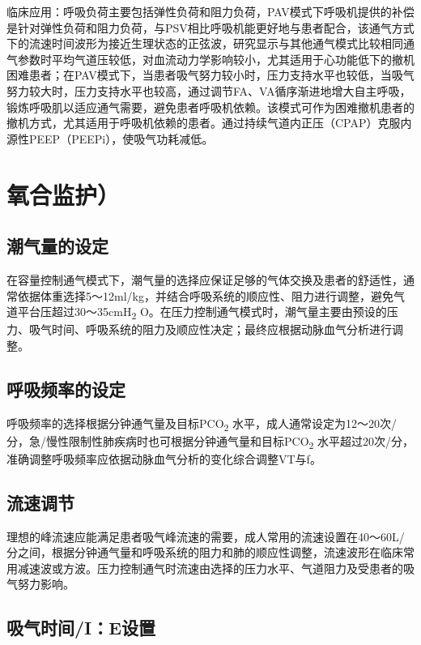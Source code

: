 临床应用：呼吸负荷主要包括弹性负荷和阻力负荷，PAV模式下呼吸机提供的补偿是针对弹性负荷和阻力负荷，与PSV相比呼吸机能更好地与患者配合，该通气方式下的流速时间波形为接近生理状态的正弦波，研究显示与其他通气模式比较相同通气参数时平均气道压较低，对血流动力学影响较小，尤其适用于心功能低下的撤机困难患者；在PAV模式下，当患者吸气努力较小时，压力支持水平也较低，当吸气努力较大时，压力支持水平也较高，通过调节FA、VA循序渐进地增大自主呼吸，锻炼呼吸肌以适应通气需要，避免患者呼吸机依赖。该模式可作为困难撤机患者的撤机方式，尤其适用于呼吸机依赖的患者。通过持续气道内正压（CPAP）克服内源性PEEP（PEEPi），使吸气功耗减低。

\section{氧合监护）}

\subsection{潮气量的设定}

在容量控制通气模式下，潮气量的选择应保证足够的气体交换及患者的舒适性，通常依据体重选择5～12ml/kg，并结合呼吸系统的顺应性、阻力进行调整，避免气道平台压超过30～35cmH\textsubscript{2}
O。在压力控制通气模式时，潮气量主要由预设的压力、吸气时间、呼吸系统的阻力及顺应性决定；最终应根据动脉血气分析进行调整。

\subsection{呼吸频率的设定}

呼吸频率的选择根据分钟通气量及目标PCO\textsubscript{2}
水平，成人通常设定为12～20次/分，急/慢性限制性肺疾病时也可根据分钟通气量和目标PCO\textsubscript{2}
水平超过20次/分，准确调整呼吸频率应依据动脉血气分析的变化综合调整VT与f。

\subsection{流速调节}

理想的峰流速应能满足患者吸气峰流速的需要，成人常用的流速设置在40～60L/分之间，根据分钟通气量和呼吸系统的阻力和肺的顺应性调整，流速波形在临床常用减速波或方波。压力控制通气时流速由选择的压力水平、气道阻力及受患者的吸气努力影响。

\subsection{吸气时间/I：E设置}


